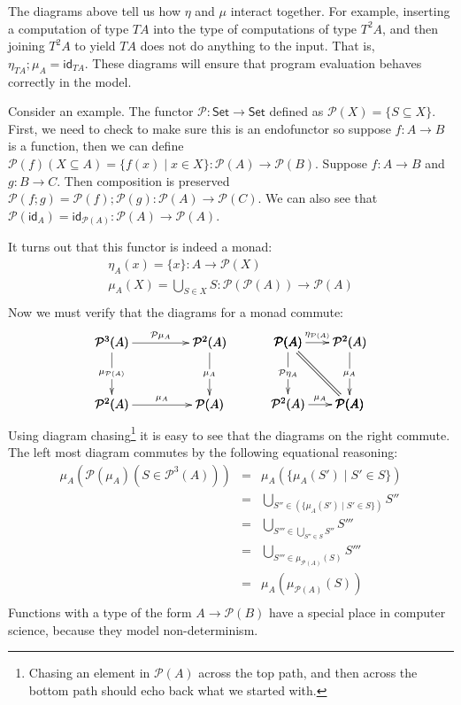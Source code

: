 \documentclass{article}
\let\mto\to
\let\to\relax
\newcommand{\to}{\rightarrow}
\newcommand{\id}[0]{\mathsf{id}}
\begin{document}
The diagrams above tell us how $\eta$ and $\mu$ interact together.
For example, inserting a computation of type $TA$ into the type of
computations of type $T^2A$, and then joining $T^2A$ to yield $TA$
does not do anything to the input.  That is, $\eta_{TA};\mu_A =
\id_{TA}$.  These diagrams will ensure that program evaluation behaves
correctly in the model.

Consider an example.  The functor $\mathcal{P} : \mathsf{Set} \mto
\mathsf{Set}$ defined as $\mathcal{P}(X) = \{S \subseteq X\}$.  First,
we need to check to make sure this is an endofunctor so suppose $f : A
\mto B$ is a function, then we can define $\mathcal{P}(f)(X \subseteq
A) = \{f(x) \mid x \in X \} : \mathcal{P}(A) \mto
\mathcal{P}(B)$. Suppose $f : A \mto B$ and $g : B \mto C$.  Then
composition is preserved $\mathcal{P}(f;g) =
\mathcal{P}(f);\mathcal{P}(g) : \mathcal{P}(A) \mto \mathcal{P}(C)$.  We
can also see that $\mathcal{P}(\id_A) =
\id_{\mathcal{P}(A)} : \mathcal{P}(A) \mto \mathcal{P}(A)$.

It turns out that this functor is indeed a monad:
\[
\begin{array}{lll}
  \eta_A(x) = \{x\} : A \mto \mathcal{P}(X)\\
  \mu_A(X) = \bigcup_{S \in X}S : \mathcal{P}(\mathcal{P}(A)) \mto \mathcal{P}(A)\\
\end{array}
\]
Now we must verify that the diagrams for a monad commute:
\[
\begin{array}{ccc}
  \bfig
  \Square|amma|[
    \mathcal{P}^3 (A)`
    \mathcal{P}^2(A)`
    \mathcal{P}^2(A)`
    \mathcal{P}(A);
    \mathcal{P}\mu_A`
    \mu_{\mathcal{P}(A)}`
    \mu_A`
    \mu_A]
  \efig
  & \quad &
  \bfig
  \qtriangle|amm|/->`=`->/[
    \mathcal{P}(A)`
    \mathcal{P}^2(A)`
    \mathcal{P}(A);
    \eta_{\mathcal{P}(A)}``
    \mu_A]
  \btriangle|mma|/->`=`->/[
    \mathcal{P}(A)`
    \mathcal{P}^2(A)`
    \mathcal{P}(A);
    \mathcal{P}\eta_A``
    \mu_A]
  \efig
\end{array}
\]
Using diagram chasing\footnote{Chasing an element in $\mathcal{P}(A)$
  across the top path, and then across the bottom path should echo
  back what we started with.} it is easy to see that the diagrams on
the right commute.  The left most diagram commutes by the following
equational reasoning:
\[
\begin{array}{lll}
  \mu_{A}(\mathcal{P}(\mu_A)(S \in \mathcal{P}^3(A)))
  & = & \mu_{A}(\{\mu_A(S') \mid S' \in S\})\\
  & = & \bigcup_{S'' \in (\{\mu_A(S') \mid S' \in S\})} S''\\
  & = & \bigcup_{S''' \in \bigcup_{S'' \in S} S''}S'''\\
  & = & \bigcup_{S''' \in \mu_{\mathcal{P}(A)}(S)}S'''\\
  & = & \mu_{A}(\mu_{\mathcal{P}(A)}(S))\\
\end{array}
\]
Functions with a type of the form $A \mto \mathcal{P}(B)$ have a
special place in computer science, because they model non-determinism.
\end{document}

